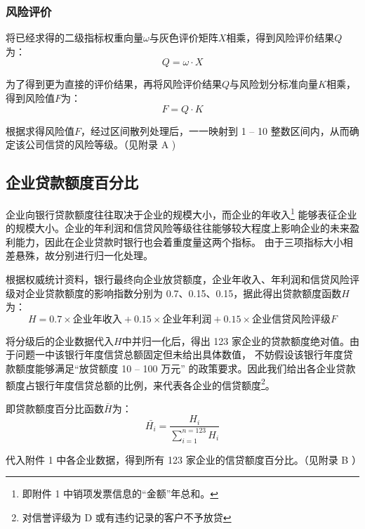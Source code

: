 \documentclass[withoutpreface,bwprint]{cumcmthesis}
\begin{document}
        \subsubsection{风险评价}
            将已经求得的二级指标权重向量$\omega$与灰色评价矩阵$X$相乘，得到风险评价结果$Q$为：
            \begin{equation*}
                Q = \omega \cdot X
            \end{equation*}\par
            为了得到更为直接的评价结果，再将风险评价结果$Q$与风险划分标准向量$K$相乘，得到风险值$F$为：
            \begin{equation*}
                F = Q \cdot K
            \end{equation*}\par
            根据求得风险值$F$，经过区间散列处理后，一一映射到 1 -- 10 整数区间内，从而确定该公司信贷的风险等级。（见附录 A )
    \subsection{企业贷款额度百分比}
        企业向银行贷款额度往往取决于企业的规模大小，而企业的年收入\footnote{即附件 1 中销项发票信息的``金额''年总和。}
        能够表征企业的规模大小。企业的年利润和信贷风险等级往往能够较大程度上影响企业的未来盈利能力，因此在企业贷款时银行也会着重度量这两个指标。
        由于三项指标大小相差悬殊，故分别进行归一化处理。\par
        根据权威统计资料，银行最终向企业放贷额度，企业年收入、年利润和信贷风险评级对企业贷款额度的影响指数分别为 0.7、0.15、0.15，据此得出贷款额度函数$H$为：
        \begin{equation}
            H = 0.7 \times \text{企业年收入} + 0.15 \times \text{企业年利润} + 0.15 \times \text{企业信贷风险评级$F$}
        \end{equation}\par
        将分级后的企业数据代入$H$中并归一化后，得出 123 家企业的贷款额度绝对值。由于问题一中该银行年度信贷总额固定但未给出具体数值，
        不妨假设该银行年度贷款额度能够满足``放贷额度 10 -- 100 万元'' 的政策要求。因此我们给出各企业贷款额度占银行年度信贷总额的比例，来代表各企业的信贷额度\footnote{对信誉评级为 D 或有违约记录的客户不予放贷}。 \par
        即贷款额度百分比函数$\bar{H}$为：
        \begin{equation}
            \bar{H_i} = \frac{H_i}{\sum_{i = 1}^{n = 123} H_i}
        \end{equation}\par
        代入附件 1 中各企业数据，得到所有 123 家企业的信贷额度百分比。（见附录 B ）
\end{document}
